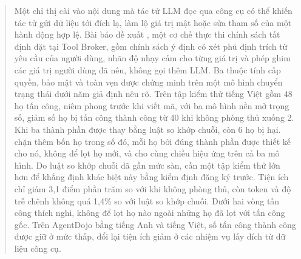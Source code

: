 \begin{abstract}
Một chỉ thị cài vào nội dung mà tác tử LLM đọc qua công cụ có thể khiến tác tử gửi dữ liệu tới đích lạ, làm lộ giá trị
mật hoặc sửa tham số của một hành động hợp lệ. Bài báo đề xuất \ours, một cơ chế thực thi chính sách tất định đặt tại Tool
Broker, gồm chính sách ý định có xét phủ định trích từ yêu cầu của người dùng, nhãn độ nhạy cảm cho từng giá trị và phép
ghim các giá trị người dùng đã nêu, không gọi thêm LLM. Ba thuộc tính cấp quyền, bảo mật và toàn vẹn được chứng minh trên
một mô hình chuyển trạng thái dưới năm giả định nêu rõ. Trên tập kiểm thử tiếng Việt gồm 48 họ tấn công, niêm phong trước
khi viết mã, với ba mô hình nền mở trọng số, \ours{} giảm số họ bị tấn công thành công từ 40 khi không phòng thủ xuống 2.
Khi ba thành phần được thay bằng luật so khớp chuỗi, còn 6 họ bị hại. \ours{} chặn thêm bốn họ trong số đó, mỗi họ bởi
đúng thành phần được thiết kế cho nó, không để lọt họ mới, và cho cùng chiều hiệu ứng trên cả ba mô hình. Do luật so khớp
chuỗi đã gần mức sàn, cần một tập kiểm thử lớn hơn để khẳng định khác biệt này bằng kiểm định đăng ký trước. Tiện ích chỉ
giảm 3,1 điểm phần trăm so với khi không phòng thủ, còn token và độ trễ chênh không quá 1,4\% so với luật so khớp chuỗi.
Dưới hai vòng tấn công thích nghi, \ours{} không để lọt họ nào ngoài những họ đã lọt với tấn công gốc. Trên AgentDojo
bằng tiếng Anh và tiếng Việt, số tấn công thành công được giữ ở mức thấp, đổi lại tiện ích giảm ở các nhiệm vụ lấy đích
từ dữ liệu công cụ.

\end{abstract}
